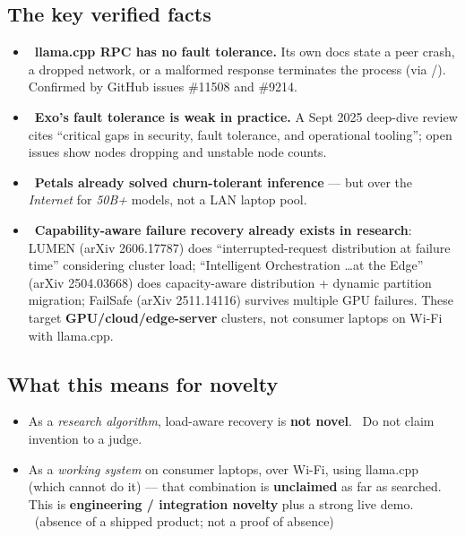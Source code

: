 \subsection{The key verified facts}
\begin{itemize}[leftmargin=1.4em,nosep]
  \item \VER\ \textbf{llama.cpp RPC has no fault tolerance.} Its own docs state a
  peer crash, a dropped network, or a malformed response terminates the process
  (via /). Confirmed by GitHub issues
  \#11508 and \#9214.
  \item \VER\ \textbf{Exo's fault tolerance is weak in practice.} A Sept 2025
  deep-dive review cites ``critical gaps in security, fault tolerance, and
  operational tooling''; open issues show nodes dropping and unstable node counts.
  \item \VER\ \textbf{Petals already solved churn-tolerant inference} --- but
  over the \emph{Internet} for \emph{50B+} models, not a LAN laptop pool.
  \item \VER\ \textbf{Capability-aware failure recovery already exists in
  research}: LUMEN (arXiv 2606.17787) does ``interrupted-request distribution at
  failure time'' considering cluster load; ``Intelligent Orchestration \ldots at
  the Edge'' (arXiv 2504.03668) does capacity-aware distribution + dynamic
  partition migration; FailSafe (arXiv 2511.14116) survives multiple GPU
  failures. These target \textbf{GPU/cloud/edge-server} clusters, not consumer
  laptops on Wi-Fi with llama.cpp.
\end{itemize}

\subsection{What this means for novelty}
\begin{itemize}[leftmargin=1.4em,nosep]
  \item As a \emph{research algorithm}, load-aware recovery is \textbf{not
  novel}. \VER\ Do not claim invention to a judge.
  \item As a \emph{working system} on consumer laptops, over Wi-Fi, using
  llama.cpp (which cannot do it) --- that combination is \textbf{unclaimed} as
  far as searched. This is \textbf{engineering / integration novelty} plus a
  strong live demo. \HYP\ (absence of a shipped product; not a proof of absence)
\end{itemize}

